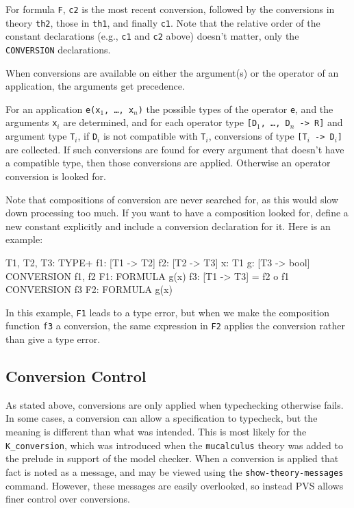 For formula \texttt{F}, \texttt{c2} is the most recent conversion,
followed by the conversions in theory \texttt{th2}, those in \texttt{th1},
and finally \texttt{c1}.  Note that the relative order of the constant
declarations (e.g., \texttt{c1} and \texttt{c2} above) doesn't matter,
only the \texttt{CONVERSION} declarations.

When conversions are available on either the argument(s) or the operator
of an application, the arguments get precedence.

For an application \texttt{e(x$_1$, \ldots, x$_n$)} the possible types of
the operator \texttt{e}, and the arguments \texttt{x$_i$} are determined,
and for each operator type \texttt{[D$_1$, \ldots, D$_n$ -> R]} and
argument type \texttt{T$_i$}, if \texttt{D$_i$} is not compatible with
\texttt{T$_i$}, conversions of type \texttt{[T$_i$ -> D$_i$]} are
collected.  If such conversions are found for every argument that doesn't
have a compatible type, then those conversions are applied.  Otherwise an
operator conversion is looked for.

Note that compositions of conversion are never searched for, as this would
slow down processing too much.  If you want to have a composition looked
for, define a new constant explicitly and include a conversion
declaration for it.  Here is an example:
\begin{pvsex}
  T1, T2, T3: TYPE+
  f1: [T1 -> T2]
  f2: [T2 -> T3]
  x: T1
  g: [T3 -> bool]
  CONVERSION f1, f2
  F1: FORMULA g(x)
  f3: [T1 -> T3] = f2 o f1
  CONVERSION f3
  F2: FORMULA g(x)
\end{pvsex}
In this example, \texttt{F1} leads to a type error, but when we make the
composition function \texttt{f3} a conversion, the same expression in
\texttt{F2} applies the conversion rather than give a type error.

\subsection{Conversion Control}

As stated above, conversions are only applied when typechecking otherwise
fails.  In some cases, a conversion can allow a specification to
typecheck, but the meaning is different than what was intended.  This is
most likely for the \texttt{K\_conversion}, which was introduced when the
\texttt{mucalculus} theory was added to the prelude in support of the
model checker.  When a conversion is applied that fact is noted as a
message, and may be viewed using the \texttt{show-theory-messages}
command.  However, these messages are easily overlooked, so instead PVS
allows finer control over conversions.


